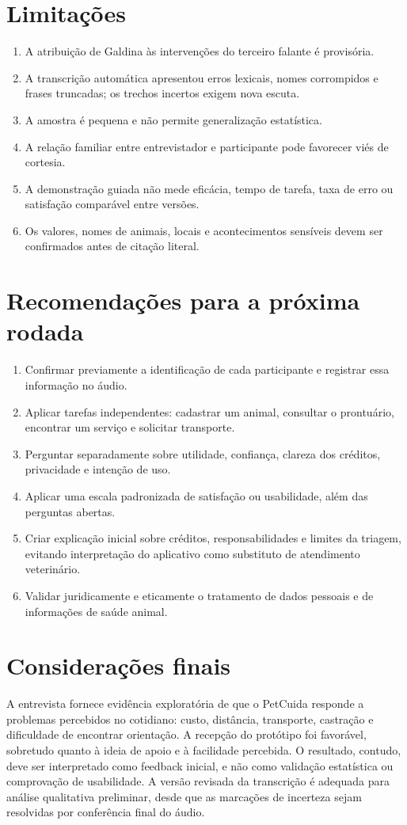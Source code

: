 \documentclass[12pt,a4paper]{article}
\begin{document}
\section{Limitações}
\begin{enumerate}[leftmargin=*]
\item A atribuição de Galdina às intervenções do terceiro falante é provisória.
\item A transcrição automática apresentou erros lexicais, nomes corrompidos e frases truncadas; os trechos incertos exigem nova escuta.
\item A amostra é pequena e não permite generalização estatística.
\item A relação familiar entre entrevistador e participante pode favorecer viés de cortesia.
\item A demonstração guiada não mede eficácia, tempo de tarefa, taxa de erro ou satisfação comparável entre versões.
\item Os valores, nomes de animais, locais e acontecimentos sensíveis devem ser confirmados antes de citação literal.
\end{enumerate}
\section{Recomendações para a próxima rodada}
\begin{enumerate}[label=R\arabic*.,leftmargin=*]
\item Confirmar previamente a identificação de cada participante e registrar essa informação no áudio.
\item Aplicar tarefas independentes: cadastrar um animal, consultar o prontuário, encontrar um serviço e solicitar transporte.
\item Perguntar separadamente sobre utilidade, confiança, clareza dos créditos, privacidade e intenção de uso.
\item Aplicar uma escala padronizada de satisfação ou usabilidade, além das perguntas abertas.
\item Criar explicação inicial sobre créditos, responsabilidades e limites da triagem, evitando interpretação do aplicativo como substituto de atendimento veterinário.
\item Validar juridicamente e eticamente o tratamento de dados pessoais e de informações de saúde animal.
\end{enumerate}
\section{Considerações finais}
A entrevista fornece evidência exploratória de que o PetCuida responde a problemas percebidos no cotidiano: custo, distância, transporte, castração e dificuldade de encontrar orientação. A recepção do protótipo foi favorável, sobretudo quanto à ideia de apoio e à facilidade percebida. O resultado, contudo, deve ser interpretado como feedback inicial, e não como validação estatística ou comprovação de usabilidade. A versão revisada da transcrição é adequada para análise qualitativa preliminar, desde que as marcações de incerteza sejam resolvidas por conferência final do áudio.
\appendix
\end{document}
